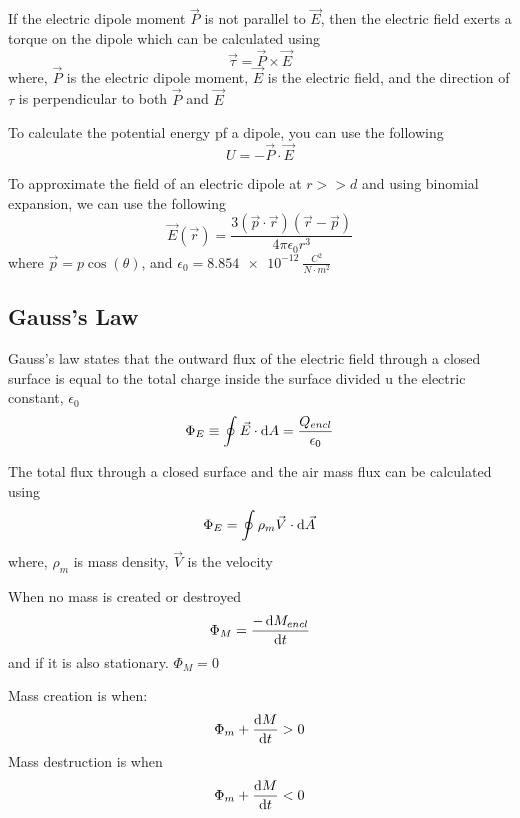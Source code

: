 If the electric dipole moment $\vec{P}$ is not parallel to $\vec{E}$, then the electric field exerts a torque on the dipole which can be calculated using
\begin{equation}
\vec{\tau} = \vec{P} \times \vec{E}
\end{equation}
where, $\vec{P}$ is the electric dipole moment, $\vec{E}$ is the electric field, and the direction of $\tau$ is perpendicular to both $\vec{P}$ and $\vec{E}$

To calculate the potential energy pf a dipole, you can use the following
\begin{equation}
U = -\vec{P}\cdot \vec{E}
\end{equation}

To approximate the field of an electric dipole at $r>>d$ and using binomial expansion, we can use the following
\begin{equation}
\vec{E}(\vec{r}) = \frac{3(\vec{p}\cdot \vec{r})(\vec{r} - \vec{p})}{4 \pi \epsilon_0 r^3}
\end{equation}
where $\vec{p} = p\cos(\theta)$, and $\epsilon_0 = \SI{8.854e-12}{\frac{C^2}{N \cdot m^2}}$
\newpage
\subsection{Gauss's Law}
Gauss's law states that the outward flux of the electric field through a closed surface is equal to the total charge inside the surface divided u the electric constant, $\epsilon_0$
\begin{equation}
\Phi_E \equiv \oint \vec{E}\cdot \operatorname{d\!} A = \frac{Q_{encl}}{\epsilon_0}
\end{equation}

The total flux through a closed surface and the air mass flux can be calculated using
\begin{equation}
\Phi_E = \oint\rho_m \vec{V} \cdot \operatorname{d\!} \vec{A}
\end{equation}
where, $\rho_m$ is mass density, $\vec{V}$ is the velocity 

When no mass is created or destroyed
\begin{equation}
\Phi_M = \frac{-\operatorname{d\!} M_{encl}}{\operatorname{d\!} t}
\end{equation}
and if it is also stationary. $\Phi_M = 0$

Mass creation is when:
\begin{equation}
\Phi_m + \frac{\operatorname{d\!} M}{\operatorname{d\!} t} > 0
\end{equation}
Mass destruction is when
\begin{equation}
\Phi_m + \frac{\operatorname{d\!} M}{\operatorname{d\!} t} < 0
\end{equation}

